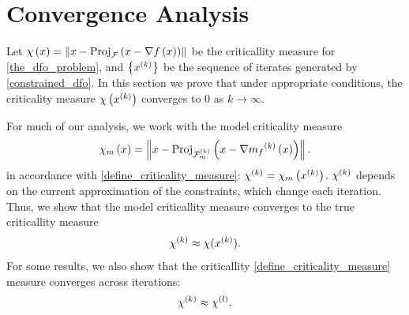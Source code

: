 \section{Convergence Analysis}
\label{convex_convergence_analysis}

Let $\chi\left(x\right) = \left\|x - \textrm{Proj}_{{\mathcal F}}\left(x- \nabla f\left(x\right)\right)\right\|$
be the criticallity measure for \cref{the_dfo_problem}, and $\left\{x^{(k)}\right\}$ be the sequence of iterates generated by \cref{constrained_dfo}.
In this section we prove that under appropriate conditions, the criticality measure $\chi\left(x^{(k)}\right)$ converges to $0$ as $k\to\infty$.

For much of our analysis, we work with the model criticality measure
\begin{align*}
\chi_m\left(x\right) = \left\|x - \textrm{Proj}_{{\mathcal F_m^{(k)}}}\left(x- \nabla {{m}_f}^{(k)}\left(x\right)\right)\right\|.
\end{align*}
in accordance with \cref{define_criticality_measure}: ${\chi^{(k)}} = \chi_m\left(x^{(k)}\right)$.
${\chi^{(k)}}$ depends on the current approximation of the constraints, which change each iteration.
Thus, we show that the model criticallity measure converges to the true criticallity measure
\begin{align}
\label{verbiage_hoffman_use_one}
{\chi^{(k)}} \approx \chi (x^{(k)}).
\end{align}
For some results, we also show that the criticallity \cref{define_criticality_measure} measure converges across iterations:
\begin{align}
\label{verbiage_hoffman_use_two}
{\chi^{(k)}} \approx {\chi^{(l)}}.
\end{align}


